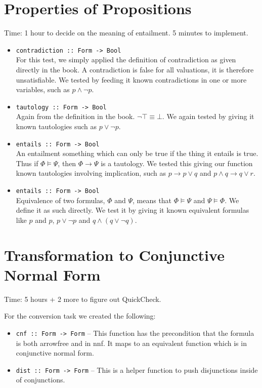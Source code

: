 \documentclass[11pt,a4paper]{article}
\numberwithin{equation}{section}%
\begin{document}
\section{Properties of Propositions}
Time: 1 hour to decide on the meaning of entailment. 5 minutes to implement.
\begin{itemize}
    \item \texttt{contradiction :: Form -> Bool} \\
        For this test, we simply applied the definition of contradiction as given directly in the book. A contradiction is false for all valuations, it is therefore unsatisfiable. We tested by feeding it known contradictions in one or more variables, such as $p \wedge \neg p$.
    \item \texttt{tautology :: Form -> Bool} \\
        Again from the definition in the book. $\neg \top \equiv \bot$. We again tested by giving it known tautologies such as $p \vee \neg p$.
    \item \texttt{entails :: Form -> Bool} \\
        An entailment something which can only be true if the thing it entails is true. Thus if $\Phi \models \Psi$, then $\Phi \rightarrow \Psi$ is a tautology. We tested this giving our function known tautologies involving implication, such as $p \rightarrow p \vee q$ and $p \wedge q \rightarrow q \vee r$.
    \item \texttt{entails :: Form -> Bool} \\ 
        Equivalence of two formulas, $\Phi$ and $\Psi$, means that $\Phi \models \Psi$ and $\Psi \models \Phi$. We define it as such directly. We test it by giving it known equivalent formulas like $p$ and $p$, $p \vee \neg p$ and $q \wedge (q \vee \neg q)$.
\end{itemize}


\section{Transformation to Conjunctive Normal Form}
Time: 5 hours + 2 more to figure out QuickCheck.

For the conversion task we created the following:
\begin{itemize}
    \item \texttt{cnf :: Form -> Form} \---
        This function has the precondition that the formula is both arrowfree and in nnf. It maps to an equivalent function which is in conjunctive normal form.
    \item \texttt{dist :: Form -> Form} \---
        This is a helper function to push disjunctions inside of conjunctions.
\end{itemize}
\end{document}
